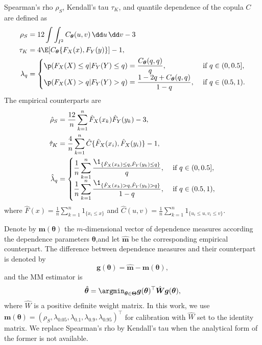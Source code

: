 Spearman's rho $\rho_S$, Kendall's tau $\tau_K$, and quantile dependence of the copula $C$ are defined as
\begin{align*}
  \rho_S &= 12 \int\int_{I^2} C_{\bm{\theta}}(u,v)\, \dd u\, \dd v-3\label{eq:rho_S}\\
  \tau_K &= 4\E[C_{\bm{\theta}}\{F_X(x), F_Y(y)\}]-1,\\
  \lambda_q &=
  \begin{cases}
    \p(F_X(X)\leq q| F_Y(Y)\leq q) = \displaystyle \frac{C_{\bm{\theta}}(q,q)}{q},
    &\text{ if } q\in (0,0.5],\\
    \p(F_X(X)>q|F_Y(Y)>q) =\displaystyle \frac{1-2q+C_{\bm{\theta}}(q,q)} {1-q},
    &\text{ if } q\in (0.5,1).
  \end{cases}
\end{align*}
The empirical counterparts are
\begin{align*}
  \hat\rho_S &= \frac{12}{n} \sum_{k=1}^n \hat F_X(x_k) \hat F_Y(y_k)
               -3,\\
  \hat\tau_K &= \frac{4}{n}\sum_{k=1}^n \hat{C}\{\hat{F}_X(x_i),\hat{F}_X(y_i)\} -1 ,\\
  \hat\lambda_q &=
                  \begin{cases}
                    \displaystyle\frac{1}{n} \sum_{k=1}^n \frac{\1_{\{\hat
                        F_X(x_k)\leq q, \hat F_Y(y_k)\leq q\}}} {q},
                    &\text { if } q\in (0, 0.5],\\
                    \displaystyle \frac{1}{n} \sum_{k=1}^n
                    \frac{\1_{\{\hat F_X(x_k)>q, \hat F_Y(y_k)>q\}}}
                    {1-q}, &\text { if } q\in (0.5,1),
                  \end{cases}
\end{align*}
where $\displaystyle \hat{F}(x) =
  \frac{1}{n}\sum_{k=1}^n 1_{\{x_i\leq x\}}$ and
$\displaystyle \hat{C}(u,v) = \frac{1}{n}\sum_{k=1}^n 1_{\{u_i\leq u, v_i\leq v\}}$. 

Denote by $\bm{m}(\bm{\theta})$ the $m$-dimensional vector of
dependence measures according the dependence parameters
$\bm{\theta}$,and let $\hat{\bm{m}}$ be the corresponding empirical
counterpart. 
The difference between dependence measures and their counterpart is denoted by
\begin{equation*}
    \bm{g}(\bm{\theta}) = \hat{\bm{m}} - \bm{m}(\bm{\theta}),
\end{equation*}
and the MM estimator is
\begin{equation*}
    \hat{\bm{\theta}} = \argmin_{\bm{\theta}\in \bm{\Theta}} \bm{g}(\bm{\theta})^\top
    \hat{\bm{W}}
     \bm{g}(\bm{\theta}),
\end{equation*}
where $\hat{W}$ is a positive definite weight matrix.
In this work, we use
$\bm{m}(\bm{\theta}) = (\rho_S, \lambda_{0.05}, \lambda_{0.1}, 
\lambda_{0.9}, \lambda_{0.95})^\top$
for calibration with 
$\hat{W}$ set to the identity matrix. 
We replace Spearman's rho by Kendall's tau when the analytical form of the former is not available. 

